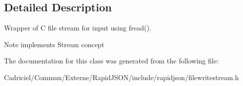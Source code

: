 \subsection{Detailed Description}
Wrapper of C file stream for input using fread(). 

\begin{DoxyNote}{Note}
implements Stream concept 
\end{DoxyNote}


The documentation for this class was generated from the following file\+:\begin{DoxyCompactItemize}
\item 
Cadriciel/\+Commun/\+Externe/\+Rapid\+J\+S\+O\+N/include/rapidjson/filewritestream.\+h\end{DoxyCompactItemize}
